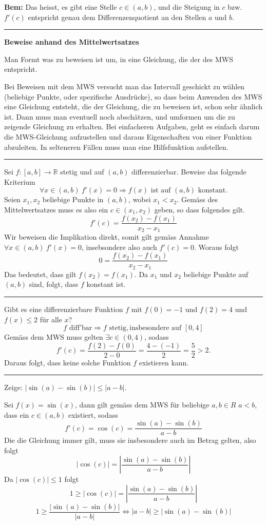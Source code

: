 \documentclass[a4paper,landscape,8pt]{extarticle}
\newcommand{\R}{\mathbb{R}}
\newcommand{\abs}[1]{\left\lvert #1 \right\rvert}
\newcommand{\sep}{\vspace{5pt}\noindent\hrule\vspace{5pt}}
\newcommand{\Bem}{\textbf{Bem: }}
\begin{document}
\begin{multicols*}{4}
\Bem Das heisst, es gibt eine Stelle $c\in(a,b)$, und die Steigung in $c$ bzw.
$f'(c)$ entspricht genau dem Differenzenquotient an den Stellen $a$ und $b$.

\sep

\textbf{Beweise anhand des Mittelwertsatzes}

\Vorgehen Man Formt was zu beweisen ist um, in eine Gleichung, die der des MWS
entspricht.

\Vorgehen Bei Beweisen mit dem MWS versucht man das Intervall geschickt zu
wählen (beliebige Punkte, oder spezifische Ausdrücke), so dass beim Anwenden des
MWS eine Gleichung entsteht, die der Gleichung, die zu beweisen ist, schon sehr
ähnlich ist. Dann muss man eventuell noch abschätzen, und umformen um die zu
zeigende Gleichung zu erhalten. Bei einfacheren Aufgaben, geht es einfach darum
die MWS-Gleichung aufzustellen und daraus Eigenschaften von einer Funktion
abzuleiten. In selteneren Fällen muss man eine Hilfsfunktion aufstellen.

\begin{warmup}
\sep

\Bsp Sei $f\colon [a,b]\to\R$ stetig und auf $(a,b)$ differenzierbar. Beweise
das folgende Kriterium
\[
\forall x \in(a,b) \ f'(x)=0 \Longrightarrow f(x) \text{ ist auf } (a,b)
\text{ konstant.}
\]
Seien $x_1,x_2$ beliebige Punkte in $(a,b)$, wobei $x_1<x_2$. Gemäss des
Mittelwertsatzes muss es also ein $c\in(x_1,x_2)$ geben, so dass folgendes gilt.
\[
f'(c) = \frac{f(x_2)-f(x_1)}{x_2-x_1}
\]
Wir beweisen die Implikation direkt, somit gilt gemäss Annahme $\forall x
\in(a,b) \ f'(x)=0$, insebsondere also auch $f'(c)=0$. Woraus folgt
\[
0 = \frac{f(x_2)-f(x_1)}{x_2-x_1}
\]
Das bedeutet, dass gilt $f(x_2) = f(x_1)$. Da $x_1$ und $x_2$ beliebige Punkte
auf $(a,b)$ sind, folgt, dass $f$ konstant ist.

\sep

\Bsp Gibt es eine differenzierbare Funktion $f$ mit $f(0)=-1$ und $f(2)=4$ und
$f(x)\leq 2$ für alle $x$?
\[
f \text{ diff'bar} \Longrightarrow f \text{ stetig}, \text{insbesondere auf }
[0,4]
\]
Gemäss dem MWS muss gelten $\exists c\in (0,4)$, sodass
\[
f'(c) = \frac{f(2)-f(0)}{2-0} = \frac{4 -(-1)}{2} = \frac{5}{2} > 2.
\]
Daraus folgt, dass keine solche Funktion $f$ existieren kann.

\sep

\Bsp Zeige: $\abs{\sin(a) - \sin(b)} \leq \abs{a-b}$.

Sei $f(x)=\sin(x)$, dann gilt gemäss dem MWS für beliebige $a,b\in R$ $a<b$,
dass ein $c\in(a,b)$ existiert, sodass
\[
f'(c) = \cos(c) = \frac{\sin(a) - \sin(b)}{a-b}
\]
Die die Gleichung immer gilt, muss sie insbesondere auch im Betrag gelten, also
folgt
\[
\abs{\cos(c)} =  
\abs{\frac{\sin(a) - \sin(b)}{a-b}}
\]
Da $\abs{\cos(c)}\leq 1$ folgt
\[
1\geq \abs{\cos(c)} =   
\abs{\frac{\sin(a) - \sin(b)}{a-b}}
\]
\[
1\geq \frac{\abs{\sin(a) - \sin(b)}}{\abs{a-b}}
\Longleftrightarrow
\abs{a-b} \geq \abs{\sin(a) - \sin(b)}
\]


\end{warmup}
\end{multicols*}
\end{document}
